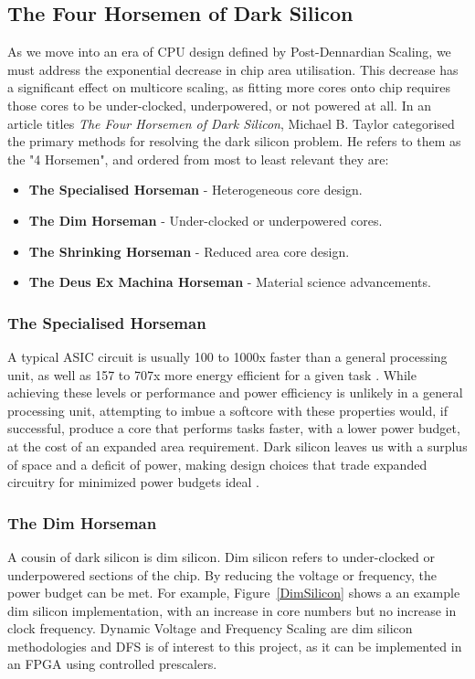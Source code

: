 		
		
		
		\subsection{The Four Horsemen of Dark Silicon}
			As we move into an era of CPU design defined by Post-Dennardian Scaling, we must address the exponential decrease in chip area utilisation. This decrease has a significant effect on multicore scaling, as fitting more cores onto chip requires those cores to be under-clocked, underpowered, or not powered at all. In an article titles \textit{The Four Horsemen of Dark Silicon}, Michael B. Taylor categorised the primary methods for resolving the dark silicon problem. He refers to them as the "4 Horsemen", and ordered from most to least relevant they are:
			
			\begin{itemize}
				\item \textbf{The Specialised Horseman} - Heterogeneous core design.
				\item \textbf{The Dim Horseman} - Under-clocked or underpowered cores. 
				\item \textbf{The Shrinking Horseman} - Reduced area core design.
				\item \textbf{The Deus Ex Machina Horseman} - Material science advancements.
			\end{itemize}
		
			\subsubsection{The Specialised Horseman}
				A typical ASIC circuit is usually 100 to 1000x faster than a general processing unit, as well as 157 to 707x more energy efficient for a given task \cite{InefficiencyInGeneralPurposeChips}. While achieving these levels or performance and power efficiency is unlikely in a general processing unit, attempting to imbue a softcore with these properties would, if successful, produce a core that performs tasks faster, with a lower power budget, at the cost of an expanded area requirement. Dark silicon leaves us with a surplus of space and a deficit of power, making design choices that trade expanded circuitry for minimized power budgets ideal \cite{DarkSideOfSilicon, TheFourHorsemen}.
				
			\subsubsection{The Dim Horseman}
				A cousin of dark silicon is dim silicon. Dim silicon refers to under-clocked or underpowered sections of the chip. By reducing the voltage or frequency, the power budget can be met. For example, Figure~\ref{DimSilicon} shows a an example dim silicon implementation, with an increase in core numbers but no increase in clock frequency. Dynamic Voltage and Frequency Scaling are dim silicon methodologies and DFS is of interest to this project, as it can be implemented in an FPGA using controlled prescalers.
				
